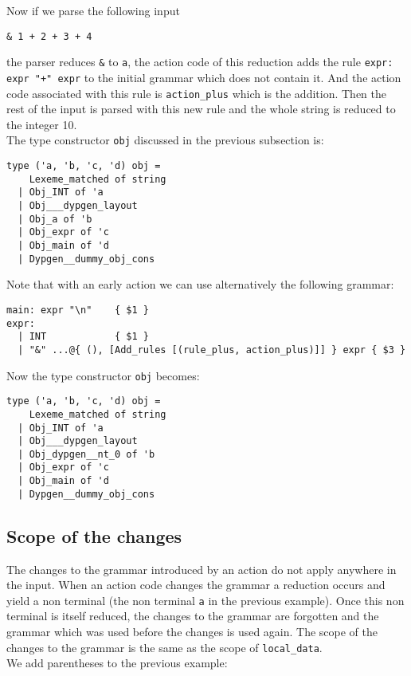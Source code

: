 \documentclass[12pt]{article}
\begin{document}
{Now if we parse the following input
\begin{verbatim}
& 1 + 2 + 3 + 4
\end{verbatim}
the parser reduces \texttt{\&} to \texttt{a}, the action code of this reduction adds the rule \verb|expr: expr "+" expr| to the initial grammar which does not contain it. And the action code associated with this rule is \verb|action_plus| which is the addition. Then the rest of the input is parsed with this new rule and the whole string is reduced to the integer 10.\\

The type constructor \verb|obj| discussed in the previous subsection is:
\begin{verbatim}
type ('a, 'b, 'c, 'd) obj =
    Lexeme_matched of string
  | Obj_INT of 'a
  | Obj___dypgen_layout
  | Obj_a of 'b
  | Obj_expr of 'c
  | Obj_main of 'd
  | Dypgen__dummy_obj_cons
\end{verbatim}

Note that with an early action we can use alternatively the following grammar:
\begin{verbatim}
main: expr "\n"    { $1 }
expr:
  | INT            { $1 }
  | "&" ...@{ (), [Add_rules [(rule_plus, action_plus)]] } expr { $3 }
\end{verbatim}

Now the type constructor \verb|obj| becomes:
\begin{verbatim}
type ('a, 'b, 'c, 'd) obj =
    Lexeme_matched of string
  | Obj_INT of 'a
  | Obj___dypgen_layout
  | Obj_dypgen__nt_0 of 'b
  | Obj_expr of 'c
  | Obj_main of 'd
  | Dypgen__dummy_obj_cons
\end{verbatim}

\subsection{Scope of the changes}\label{scope}

The changes to the grammar introduced by an action do not apply anywhere in the input. When an action code changes the grammar a reduction occurs and yield a non terminal (the non terminal \texttt{a} in the previous example). Once this non terminal is itself reduced, the changes to the grammar are forgotten and the grammar which was used before the changes is used again. The scope of the changes to the grammar is the same as the scope of \verb|local_data|.\\

We add parentheses to the previous example:

}
\end{document}

